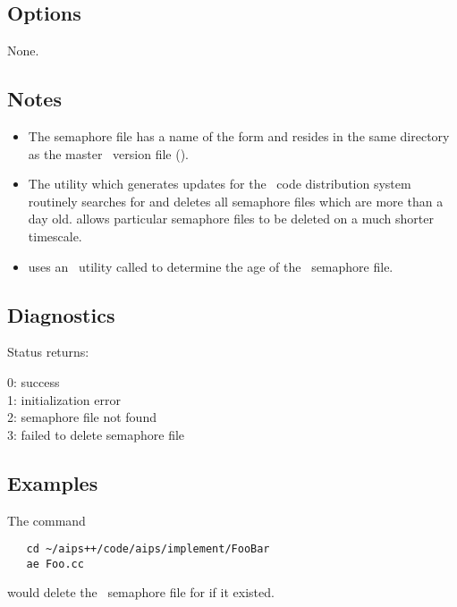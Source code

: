 \subsection*{Options}

None.

\subsection*{Notes}

\begin{itemize}
\item
   The semaphore file has a name of the form  and resides in the
   same directory as the master \rcs\ version file ().

\item
   The utility which generates updates for the \aipspp\ code distribution
   system  routinely searches for and deletes all
   semaphore files which are more than a day old.   allows particular
   semaphore files to be deleted on a much shorter timescale.

\item
    uses an \aipspp\ utility called  to
   determine the age of the \rcs\ semaphore file.
\end{itemize}

\subsection*{Diagnostics}

Status returns:
\begin{status}
   0: success\\
   1: initialization error\\
   2: semaphore file not found\\
   3: failed to delete semaphore file
\end{status}

\subsection*{Examples}

The command

\begin{verbatim}
   cd ~/aips++/code/aips/implement/FooBar
   ae Foo.cc
\end{verbatim}

\noindent
would delete the \rcs\ semaphore file for  if it existed.

